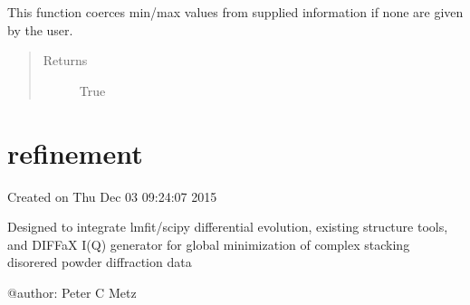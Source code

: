 \documentclass[letterpaper,10pt,english]{sphinxmanual}
\begin{document}
\begin{fulllineitems}
\begin{fulllineitems}
This function coerces min/max values from supplied information if none
are given by the user.
\begin{quote}\begin{description}
\item[{Returns}] \leavevmode
True

\end{description}\end{quote}

\end{fulllineitems}


\end{fulllineitems}



\section{refinement}
\label{\detokenize{rst/refinement:refinement}}\label{\detokenize{rst/refinement:module-mstack.refinement}}\label{\detokenize{rst/refinement::doc}}
Created on Thu Dec 03 09:24:07 2015

Designed to integrate lmfit/scipy differential evolution, existing structure
tools, and DIFFaX I(Q) generator for global minimization of complex stacking
disorered powder diffraction data

@author: Peter C Metz
\end{document}
